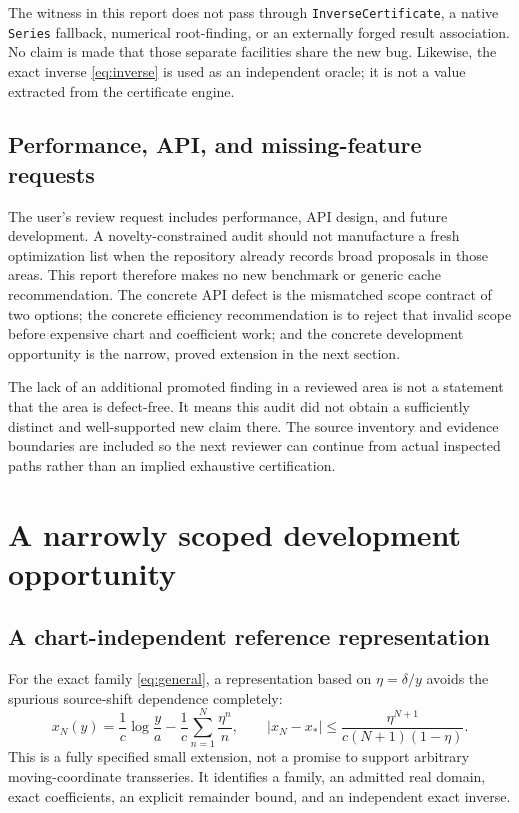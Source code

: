\documentclass[11pt,letterpaper]{article}
\newcommand{\code}[1]{\texttt{#1}}
\begin{document}
The witness in this report does not pass through \code{InverseCertificate}, a native \code{Series} fallback, numerical root-finding, or an externally forged result association. No claim is made that those separate facilities share the new bug. Likewise, the exact inverse \eqref{eq:inverse} is used as an independent oracle; it is not a value extracted from the certificate engine.

\subsection{Performance, API, and missing-feature requests}
The user's review request includes performance, API design, and future development. A novelty-constrained audit should not manufacture a fresh optimization list when the repository already records broad proposals in those areas. This report therefore makes no new benchmark or generic cache recommendation. The concrete API defect is the mismatched scope contract of two options; the concrete efficiency recommendation is to reject that invalid scope before expensive chart and coefficient work; and the concrete development opportunity is the narrow, proved extension in the next section.

The lack of an additional promoted finding in a reviewed area is not a statement that the area is defect-free. It means this audit did not obtain a sufficiently distinct and well-supported new claim there. The source inventory and evidence boundaries are included so the next reviewer can continue from actual inspected paths rather than an implied exhaustive certification.

\section{A narrowly scoped development opportunity}
\subsection{A chart-independent reference representation}
For the exact family \eqref{eq:general}, a representation based on $\eta=\delta/y$ avoids the spurious source-shift dependence completely:
\[
 x_N(y)=\frac1c\log\frac{y}{a}
        -\frac1c\sum_{n=1}^{N}\frac{\eta^n}{n},\qquad
 |x_N-x_*|\leq
 \frac{\eta^{N+1}}{c(N+1)(1-\eta)}.
\]
This is a fully specified small extension, not a promise to support arbitrary moving-coordinate transseries. It identifies a family, an admitted real domain, exact coefficients, an explicit remainder bound, and an independent exact inverse.
\end{document}
